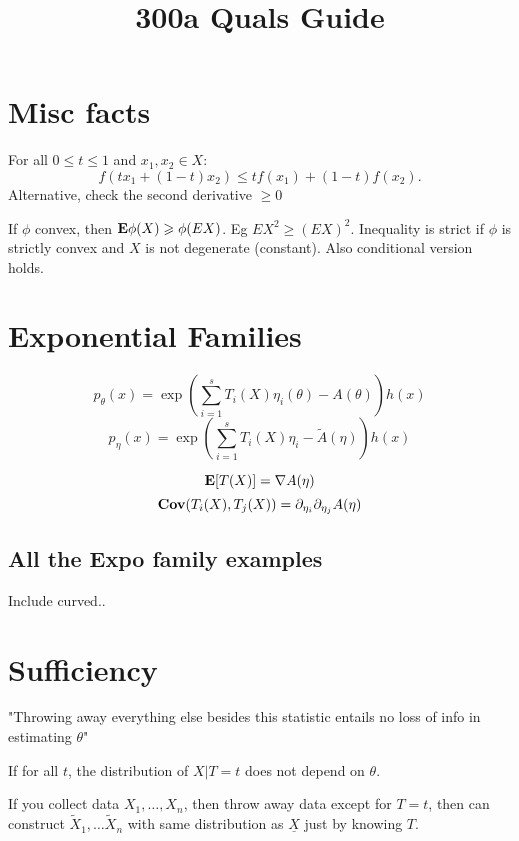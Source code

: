 \documentclass{article}
\title{300a Quals Guide}
\begin{document}
\maketitle
\section{Misc facts}
\begin{definition}[Convexity]
For all $0\leq t\leq 1$ and $x_1,x_2 \in X$:
$$f(tx_1 + (1-t)x_2) \leq tf(x_1) + (1-t) f(x_2).$$
Alternative, check the second derivative $\geq 0$
\end{definition}
\begin{theorem}
If $\phi$ convex, then $\mathbf{E} \phi(X) \geqslant \phi(EX)$. Eg $EX^2 \geq (EX)^2$. Inequality is strict if $\phi$ is strictly convex and $X$ is not degenerate (constant). Also conditional version holds. 
\end{theorem}
\section{Exponential Families}
\begin{definition}
	$$p_\theta(x) = \exp(\sum_{i=1}^s T_i(X) \eta_i(\theta) - A(\theta))h(x)$$
	$$p_\eta(x) = \exp(\sum_{i=1}^s T_i(X) \eta_i - \tilde A(\eta)) h(x)$$
\end{definition}
\begin{fact}
$$\mathbf{E}[T(X)] = \nabla A(\eta)$$
$$\mathbf{Cov} (T_i(X), T_j(X)) = \partial_{\eta_i} \partial_{\eta_j} A(\eta)$$
\end{fact}

\subsection{All the Expo family examples}

Include curved.. 


\section{Sufficiency} 
"Throwing away everything else besides this statistic entails no loss of info in estimating $\theta$"
\begin{definition}[Sufficiency]
If for all $t$, the distribution of $X|T=t$ does not depend on $\theta$.
\end{definition}
If you collect data $X_1,\ldots,X_n$, then throw away data except for $T=t$, then can construct $\tilde X_1,\ldots \tilde X_n$ with same distribution as $\underline{X}$ just by knowing $T$.
\end{document}
